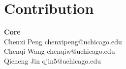 \documentclass[sigconf]{acmart}
\begin{document}
\section{Contribution}
\textbf{Core}\\
Chenxi Peng chenxipeng@uchicago.edu\\
Chenqi Wang chenqiw@uchicago.edu\\
Qicheng Jin qjin5@uchicago.edu\\




\end{document}

